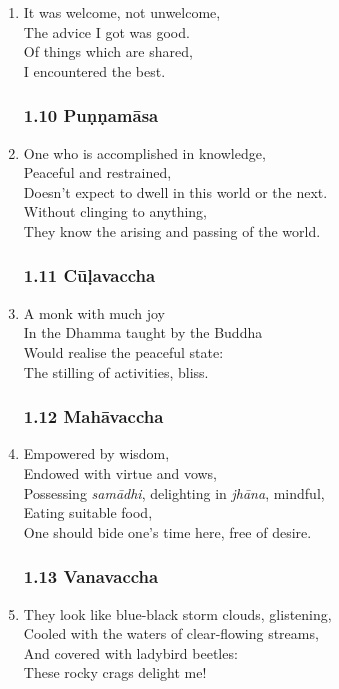 \documentclass[10pt, openany]{book}
\begin{document}
\begin{enumerate}
\item It was welcome, not unwelcome,\\
The advice I got was good.\\
Of things which are shared,\\
I encountered the best.

\subsubsection*{1.10 Puṇṇamāsa}

\item One who is accomplished in knowledge,\\
Peaceful and restrained,\\
Doesn’t expect to dwell in this world or the next.\\
Without clinging to anything,\\
They know the arising and passing of the world.

\subsubsection*{1.11 Cūḷavaccha}

\item A monk with much joy \\
In the Dhamma taught by the Buddha\\
Would realise the peaceful state:\\
The stilling of activities, bliss.

\subsubsection*{1.12 Mahāvaccha}

\item Empowered by wisdom, \\
Endowed with virtue and vows,\\
Possessing \emph{samādhi}, delighting in \emph{jhāna}, mindful,\\
Eating suitable food,\\
One should bide one’s time here, free of desire.

\subsubsection*{1.13 Vanavaccha}

\item They look like blue-black storm clouds, glistening, \\
Cooled with the waters of clear-flowing streams,\\
And covered with ladybird beetles:\\
These rocky crags delight me!


\end{enumerate}
\end{document}
